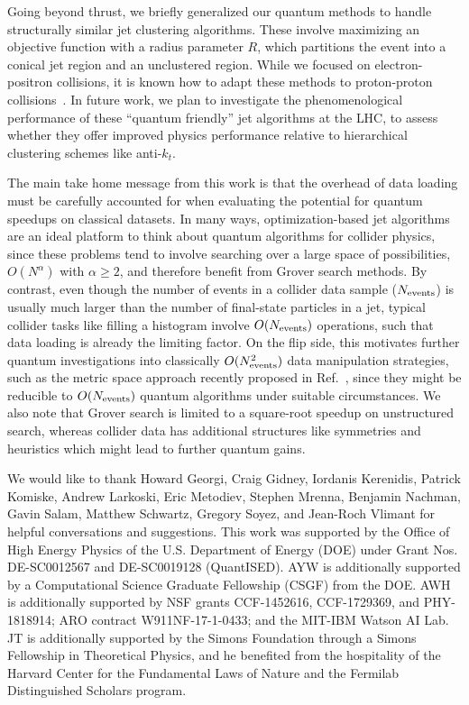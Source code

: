 \documentclass[aps,prd,twocolumn,superscriptaddress,preprintnumbers,nofootinbib,longbibliography,floatfix]{revtex4-1}
\DeclareRobustCommand{\Ref}[1]{Ref.~\cite{#1}}
\begin{document}
Going beyond thrust, we briefly generalized our quantum methods to handle structurally similar jet clustering algorithms.
%
These involve maximizing an objective function with a radius parameter $R$, which partitions the event into a conical jet region and an unclustered region.
%
While we focused on electron-positron collisions, it is known how to adapt these methods to proton-proton collisions~\cite{Bai:2014qca,Thaler:2015uja,Bai:2015fka}.
%
In future work, we plan to investigate the phenomenological performance of these ``quantum friendly'' jet algorithms at the \ac{LHC}, to assess whether they offer improved physics performance relative to hierarchical clustering schemes like anti-$k_t$.


The main take home message from this work is that the overhead of data loading must be carefully accounted for when evaluating the potential for quantum speedups on classical datasets.
%
In  many ways, optimization-based jet algorithms are an ideal platform to think about quantum algorithms for collider physics, since these problems tend to involve searching over a large space of possibilities, $O(N^\alpha)$ with $\alpha\geq 2$, and therefore benefit from Grover search methods.
%
By contrast, even though the number of events in a collider data sample ($N_{\rm events}$) is usually much larger than the number of final-state particles in a jet, typical collider tasks like filling a histogram involve $O(N_{\rm events})$ operations, such that data loading is already the limiting factor.
%
On the flip side, this motivates further quantum investigations into classically $O(N^2_{\rm events})$ data manipulation strategies, such as the metric space approach recently proposed in \Ref{Komiske:2019fks}, since they might be reducible to $O(N_{\rm events})$ quantum algorithms under suitable circumstances.
%
We also note that Grover search is limited to a square-root speedup on unstructured search, whereas collider data has additional structures like symmetries and heuristics which might lead to further quantum gains.


\begin{acknowledgments}
%
We would like to thank Howard Georgi, Craig Gidney, Iordanis Kerenidis, Patrick Komiske, Andrew Larkoski, Eric Metodiev, Stephen Mrenna, Benjamin Nachman, Gavin Salam, Matthew Schwartz, Gregory Soyez, and Jean-Roch Vlimant for helpful conversations and suggestions.
%
This work was supported by the Office of High Energy Physics of the U.S. Department of Energy (DOE) under Grant Nos. DE-SC0012567 and DE-SC0019128 (QuantISED).
%
AYW is additionally supported by a Computational Science Graduate Fellowship (CSGF) from the DOE.
%
AWH is additionally supported by NSF grants CCF-1452616, CCF-1729369, and PHY-1818914; ARO contract W911NF-17-1-0433; and the MIT-IBM Watson AI Lab.
%
JT is additionally supported by the Simons Foundation through a Simons Fellowship in Theoretical Physics, and he benefited from the hospitality of the Harvard Center for the Fundamental Laws of Nature and the Fermilab Distinguished Scholars program.

\end{acknowledgments}



\end{document}
